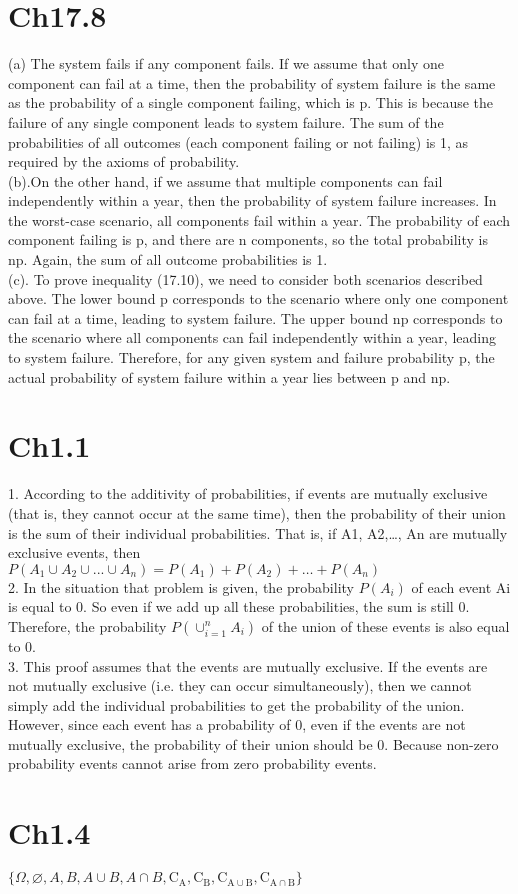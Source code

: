 \documentclass{article}
\begin{document}
\section*{Ch17.8}
(a) The system fails if any component fails. If we assume that only one component can fail at a time, then the probability of system failure is the same as the probability of a single component failing, which is p. This is because the failure of any single component leads to system failure. The sum of the probabilities of all outcomes (each component failing or not failing) is 1, as required by the axioms of probability. \\
(b).On the other hand, if we assume that multiple components can fail independently within a year, then the probability of system failure increases. In the worst-case scenario, all components fail within a year. The probability of each component failing is p, and there are n components, so the total probability is np. Again, the sum of all outcome probabilities is 1. \\
(c). To prove inequality (17.10), we need to consider both scenarios described above. The lower bound p corresponds to the scenario where only one component can fail at a time, leading to system failure. The upper bound np corresponds to the scenario where all components can fail independently within a year, leading to system failure. Therefore, for any given system and failure probability p, the actual probability of system failure within a year lies between p and np. \\ 


\clearpage

\section*{Ch1.1}
1. According to the additivity of probabilities, if events are mutually exclusive (that is, they cannot occur at the same time), then the probability of their union is the sum of their individual probabilities. That is, if A1, A2,…, An are mutually exclusive events, then $P(A_{1} \cup A_{2} \cup ... \cup A_{n}) = P(A_{1}) + P(A_{2}) + … + P(A_{n})$ \\
2. In the situation that problem is given, the probability $P(A_{i})$ of each event Ai is equal to 0. So even if we add up all these probabilities, the sum is still 0. Therefore, the probability $P(\cup_{i=1}^{n}A_{i})$ of the union of these events is also equal to 0. \\ 
3. This proof assumes that the events are mutually exclusive. If the events are not mutually exclusive (i.e. they can occur simultaneously), then we cannot simply add the individual probabilities to get the probability of the union. However, since each event has a probability of 0, even if the events are not mutually exclusive, the probability of their union should be 0. Because non-zero probability events cannot arise from zero probability events. \\ 

\section*{Ch1.4}
$\{\Omega , \varnothing , A, B, A \cup B , A \cap B , \mathrm{C_{A}}, \mathrm{C_{B}}, \mathrm{C_{A \cup B}}, \mathrm{C_{A \cap B}} \}$
\end{document}
